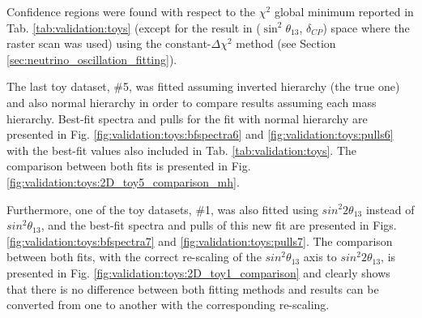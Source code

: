Confidence regions were found with respect to the $\chi^{2}$ global minimum reported in Tab. \ref{tab:validation:toys}
(except for the result in ($\sin^{2}\theta_{13}$, $\delta_{CP}$) space where the raster scan was used) 
using the constant-$\Delta\chi^{2}$ method (see Section \ref{sec:neutrino_oscillation_fitting}).

The last toy dataset, \#5, was fitted assuming inverted hierarchy (the true one) and also normal hierarchy in order to compare results assuming each mass hierarchy. Best-fit spectra and pulls for the fit with normal hierarchy are presented in Fig. \ref{fig:validation:toys:bfspectra6} and \ref{fig:validation:toys:pulls6} with the best-fit values also included in Tab. \ref{tab:validation:toys}. The comparison between both fits is presented in Fig. \ref{fig:validation:toys:2D_toy5_comparison_mh}.

Furthermore, one of the toy datasets, \#1, was also fitted using $sin^{2}2\theta_{13}$ instead of $sin^{2}\theta_{13}$, and the best-fit spectra and pulls of this new fit are presented in Figs. \ref{fig:validation:toys:bfspectra7} and \ref{fig:validation:toys:pulls7}. The comparison between both fits, with the correct re-scaling of the $sin^{2}\theta_{13}$ axis to $sin^{2}2\theta_{13}$, is presented in Fig. \ref{fig:validation:toys:2D_toy1_comparison}  and clearly shows that there is no difference between both fitting methods and results can be converted from one to another with the corresponding re-scaling. 


